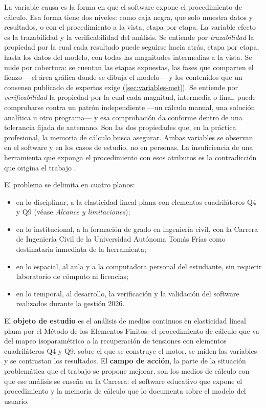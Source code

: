 La variable causa es la forma en que el software expone el procedimiento de cálculo. Esa forma tiene dos niveles: como caja negra, que solo muestra datos y resultados, o con el procedimiento a la vista, etapa por etapa. La variable efecto es la trazabilidad y la verificabilidad del análisis. Se entiende por \emph{trazabilidad} la propiedad por la cual cada resultado puede seguirse hacia atrás, etapa por etapa, hasta los datos del modelo, con todas las magnitudes intermedias a la vista. Se mide por cobertura: se cuentan las etapas expuestas, las fases que comparten el lienzo ---el área gráfica donde se dibuja el modelo--- y los contenidos que un consenso publicado de expertos exige (\autoref{sec:variables-met}). Se entiende por \emph{verificabilidad} la propiedad por la cual cada magnitud, intermedia o final, puede comprobarse contra un patrón independiente —un cálculo manual, una solución analítica u otro programa— y esa comprobación da conforme dentro de una tolerancia fijada de antemano. Son las dos propiedades que, en la práctica profesional, la memoria de cálculo busca asegurar. Ambas variables se observan en el software y en los casos de estudio, no en personas. La insuficiencia de una herramienta que exponga el procedimiento con esos atributos es la contradicción que origina el trabajo \autocite[pp.~7, 14]{alvarez_metodologia}.

El problema se delimita en cuatro planos:
\begin{itemize}
    \item en lo disciplinar, a la elasticidad lineal plana con elementos cuadriláteros Q4 y Q9 (véase \emph{Alcance y limitaciones});
    \item en lo institucional, a la formación de grado en ingeniería civil, con la Carrera de Ingeniería Civil de la Universidad Autónoma Tomás Frías como destinataria inmediata de la herramienta;
    \item en lo espacial, al aula y a la computadora personal del estudiante, sin requerir laboratorio de cómputo ni licencias;
    \item en lo temporal, al desarrollo, la verificación y la validación del software realizados durante la gestión 2026.
\end{itemize}

El \textbf{objeto de estudio} \autocite[p.~8]{alvarez_metodologia} es el análisis de medios continuos en elasticidad lineal plana por el Método de los Elementos Finitos: el procedimiento de cálculo que va del mapeo isoparamétrico a la recuperación de tensiones con elementos cuadriláteros Q4 y Q9, sobre el que se construye el motor, se miden las variables y se contrastan los resultados. El \textbf{campo de acción}, la parte de la situación problemática que el trabajo se propone mejorar, son los medios de cálculo con que ese análisis se enseña en la Carrera: el software educativo que expone el procedimiento y la memoria de cálculo que lo documenta sobre el modelo del usuario.

